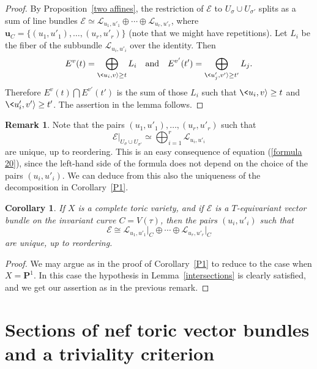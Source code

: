 \documentclass[12pt]{amsart}
\newtheorem{corollary}[lemma]{Corollary}
\theoremstyle{definition}
\newtheorem{remark}[lemma]{Remark}
\theoremstyle{remark}
\begin{document}
\begin{proof}
By Proposition~\ref{two affines}, the restriction of ${\mathcal{E}}$ to
$U_\sigma \cup U_{\sigma'}$ splits as a sum of line bundles
 ${\mathcal{E}} \simeq {\mathcal{L}}_{u_1, u'_1} \oplus \cdots \oplus {\mathcal{L}}_{u_r, u'_r}$, where ${\mathbf{u}}_C = \{(u_1, u'_1), \ldots, (u_r, u'_r)\}$
 (note that we might have repetitions).
   Let $L_i$ be the fiber of the subbundle ${\mathcal{L}}_{u_i, u'_i}$ over the identity.  Then
\[
E^v(t) = \bigoplus_{\<u_i,v{\rangle} \geq t} L_i \mbox{ \ \ and \ \ }
E^{v'}(t') = \bigoplus_{\<u'_j,v'{\rangle} \geq t'} L_j.
\]
Therefore $E^v(t) \bigcap E^{v'}(t')$ is the sum of those $L_i$ such
that $\<u_i,v{\rangle} \geq t$ and $\<u'_i, v' {\rangle} \geq t'$. The assertion
in the lemma follows.
\end{proof}

\begin{remark}\label{uniqueness}
Note that the pairs $(u_1,u'_1),\ldots,(u_r,u'_r)$ such that
$${\mathcal{E}}\vert_{U_{\sigma}\cup U_{\sigma'}}\simeq\bigoplus_{i=1}^r{\mathcal{L}}_{u_i,u'_i}$$
are unique, up to reordering. This is an easy consequence of
equation (\ref{formula 20}), since the left-hand side of the formula
does not depend on the choice of the pairs $(u_i,u'_i)$. We can
deduce from this also the uniqueness of the decomposition in
Corollary~\ref{P1}.
\end{remark}

\begin{corollary}\label{P2}
If $X$ is a complete toric variety, and if ${\mathcal{E}}$ is a
$T$-equivariant vector bundle on the invariant curve $C=V(\tau)$,
then the pairs $(u_i,u'_i)$ such that
\[
{\mathcal{E}} \cong {\mathcal{L}}_{u_1, u'_1}\vert_C \oplus \cdots \oplus {\mathcal{L}}_{u_r,
u'_r}\vert_C
\]
are unique, up to reordering.
\end{corollary}

\begin{proof}
We may argue as in the proof of Corollary~\ref{P1} to reduce to the
case when $X={{\mathbf P}}^1$. In this case the hypothesis in
Lemma~\ref{intersections} is clearly satisfied, and we get our
assertion as in the previous remark.
\end{proof}

\section{Sections of nef toric vector bundles and a triviality criterion}
\end{document}
